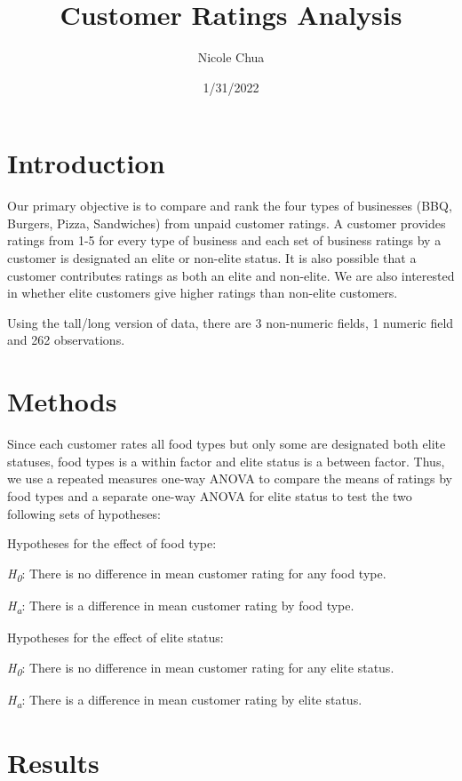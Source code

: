 \documentclass[
]{article}
\title{Customer Ratings Analysis}
\author{Nicole Chua}
\date{1/31/2022}
\begin{document}
\maketitle

\section{Introduction}

Our primary objective is to compare and rank the four types of
businesses (BBQ, Burgers, Pizza, Sandwiches) from unpaid customer
ratings. A customer provides ratings from 1-5 for every type of business
and each set of business ratings by a customer is designated an elite or
non-elite status. It is also possible that a customer contributes
ratings as both an elite and non-elite. We are also interested in
whether elite customers give higher ratings than non-elite customers.

Using the tall/long version of data, there are 3 non-numeric fields, 1
numeric field and 262 observations.

\section{Methods}

Since each customer rates all food types but only some are designated
both elite statuses, food types is a within factor and elite status is a
between factor. Thus, we use a repeated measures one-way ANOVA to
compare the means of ratings by food types and a separate one-way ANOVA
for elite status to test the two following sets of hypotheses:

Hypotheses for the effect of food type:

\emph{H\textsubscript{0}}: There is no difference in mean customer
rating for any food type.

\emph{H\textsubscript{a}}: There is a difference in mean customer rating
by food type.

Hypotheses for the effect of elite status:

\emph{H\textsubscript{0}}: There is no difference in mean customer
rating for any elite status.

\emph{H\textsubscript{a}}: There is a difference in mean customer rating
by elite status.

\section{Results}
\end{document}
